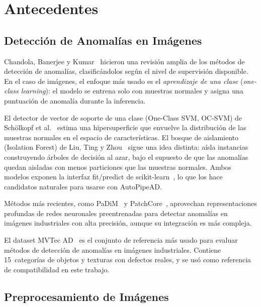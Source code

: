 \documentclass[conference,spanish]{IEEEtran}
\begin{document}
\section{Antecedentes}

\subsection{Detección de Anomalías en Imágenes}

Chandola, Banerjee y Kumar~\cite{chandola2009anomaly} hicieron una revisión
amplia de los métodos de detección de anomalías, clasificándolos según el
nivel de supervisión disponible. En el caso de imágenes, el enfoque más
usado es el \emph{aprendizaje de una clase} (\textit{one-class learning}):
el modelo se entrena solo con muestras normales y asigna una puntuación de
anomalía durante la inferencia.

El detector de vector de soporte de una clase (One-Class SVM, OC-SVM) de Schölkopf et al.~\cite{scholkopf2001ocsvm} estima una
hipersuperficie que envuelve la distribución de las muestras normales en el
espacio de características. El bosque de aislamiento (Isolation
Forest) de Liu, Ting y Zhou~\cite{liu2012isolation} sigue una idea
distinta: aísla instancias construyendo árboles de decisión al azar, bajo
el supuesto de que las anomalías quedan aisladas con menos particiones que
las muestras normales. Ambos modelos exponen la interfaz
fit/predict de scikit-learn~\cite{pedregosa2011sklearn},
lo que los hace candidatos naturales para usarse con AutoPipeAD.

Métodos más recientes, como PaDiM~\cite{defard2021padim} y
PatchCore~\cite{roth2022patchcore}, aprovechan representaciones profundas de
redes neuronales preentrenadas para detectar anomalías en imágenes
industriales con alta precisión, aunque su integración es más compleja.

El dataset MVTec AD~\cite{bergmann2019mvtec} es el conjunto de referencia
más usado para evaluar métodos de detección de anomalías en imágenes
industriales. Contiene 15~categorías de objetos y texturas con defectos
reales, y se usó como referencia de compatibilidad en este trabajo.

\subsection{Preprocesamiento de Imágenes}
\end{document}
